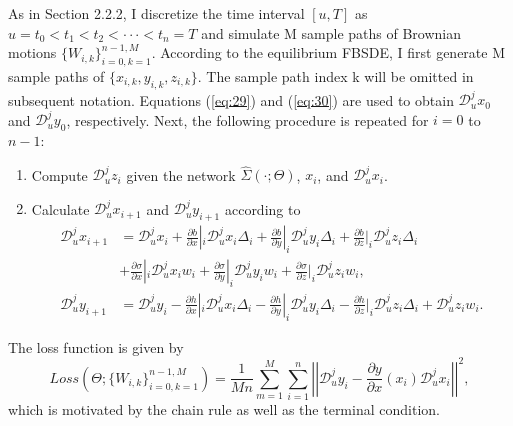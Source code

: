 \documentclass{article}
\begin{document}
As in Section 2.2.2, I discretize the time interval $[u, T]$ as $u=t_{0}<t_{1}<t_{2}<\cdot\cdot\cdot<t_{n}=T$ and simulate M sample paths of Brownian motions $\{W_{i,k}\}_{i=0,k=1}^{n-1,M}$. According to the equilibrium FBSDE, I first generate M sample paths of $\{x_{i,k},y_{i,k},z_{i,k}\}$. The sample path index k will be omitted in subsequent notation. Equations (\ref{eq:29}) and (\ref{eq:30}) are used to obtain $\mathcal{D}_{u}^{j}x_{0}$ and $\mathcal{D}_{u}^{j}y_{0}$, respectively. Next, the following procedure is repeated for $i=0$ to $n-1$:
\begin{enumerate}[label=\arabic*.]
    \item Compute $\mathcal{D}_{u}^{j}z_{i}$ given the network $\hat{\Sigma}(\cdot;\Theta)$, $x_{i}$, and $\mathcal{D}_{u}^{j}x_{i}$.
    
\clearpage
    
    \item Calculate $\mathcal{D}_{u}^{j}x_{i+1}$ and $\mathcal{D}_{u}^{j}y_{i+1}$ according to
    \begin{align*}
    \mathcal{D}_{u}^{j}x_{i+1}&=\mathcal{D}_{u}^{j}x_{i}+\frac{\partial b}{\partial x}|_{i}\mathcal{D}_{u}^{j}x_{i}\Delta_{i}+\frac{\partial b}{\partial y}|_{i}\mathcal{D}_{u}^{j}y_{i}\Delta_{i}+\frac{\partial b}{\partial z}|_{i}\mathcal{D}_{u}^{j}z_{i}\Delta_{i} \\
    &+\frac{\partial\sigma}{\partial x}|_{i}\mathcal{D}_{u}^{j}x_{i}w_{i}+\frac{\partial\sigma}{\partial y}|_{i}\mathcal{D}_{u}^{j}y_{i}w_{i}+\frac{\partial\sigma}{\partial z}|_{i}\mathcal{D}_{u}^{j}z_{i}w_{i}, \\
    \mathcal{D}_{u}^{j}y_{i+1}&=\mathcal{D}_{u}^{j}y_{i}-\frac{\partial h}{\partial x}|_{i}\mathcal{D}_{u}^{j}x_{i}\Delta_{i}-\frac{\partial h}{\partial y}|_{i}\mathcal{D}_{u}^{j}y_{i}\Delta_{i}-\frac{\partial h}{\partial z}|_{i}\mathcal{D}_{u}^{j}z_{i}\Delta_{i}+\mathcal{D}_{u}^{j}z_{i}w_{i}.
    \end{align*}
\end{enumerate}
The loss function is given by
\[
Loss(\Theta;\{W_{i,k}\}_{i=0,k=1}^{n-1,M})=\frac{1}{Mn}\sum_{m=1}^{M}\sum_{i=1}^{n}\left|\left|\mathcal{D}_{u}^{j}y_{i}-\frac{\partial y}{\partial x}(x_{i})\mathcal{D}_{u}^{j}x_{i}\right|\right|^{2},
\]
which is motivated by the chain rule as well as the terminal condition.
\end{document}
